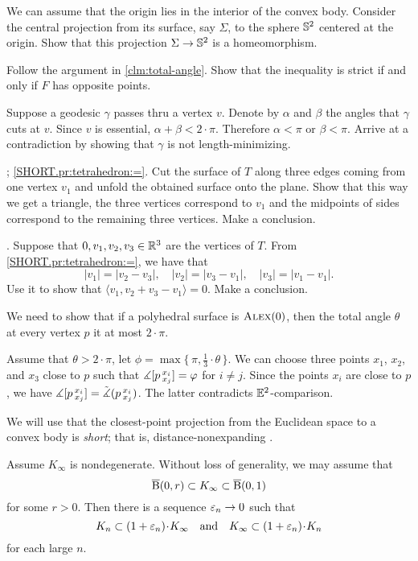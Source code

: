 We can assume that the origin lies in the interior of the convex body.
Consider the central projection from its surface, say $\Sigma$, to the sphere $\mathbb{S}^2$ centered at the origin.
Show that this projection $\Sigma\to \mathbb{S}^2$ is a homeomorphism.

Follow the argument in \ref{clm:total-angle}.
Show that the inequality is strict if and only if $F$ has opposite points.


Suppose a geodesic $\gamma$ passes thru a vertex $v$.
Denote by $\alpha$ and $\beta$ the angles that $\gamma$ cuts at $v$.
Since $v$ is essential, $\alpha+\beta<2\cdot\pi$.
Therefore $\alpha<\pi$ or $\beta<\pi$.
Arrive at a contradiction by showing that $\gamma$ is not length-minimizing.

\parbf{\ref{pr:tetrahedron}}; \ref{SHORT.pr:tetrahedron:=}.
Cut the surface of $T$ along three edges coming from one vertex $v_1$ and unfold the obtained surface onto the plane.
Show that this way we get a triangle, the three vertices correspond to $v_1$ and the midpoints of sides correspond to the remaining three vertices.
Make a conclusion.

\parit{\ref{SHORT.pr:tetrahedron:perp}}.
Suppose that $0,v_1,v_2,v_3\in\mathbb{R}^3$ are the vertices of $T$.
From \ref{SHORT.pr:tetrahedron:=}, we have that 
\[|v_1|=|v_2-v_3|,\quad |v_2|=|v_3-v_1|,\quad|v_3|=|v_1-v_1|.\]
Use it to show that $\langle v_1,v_2+v_3-v_1\rangle=0$.
Make a conclusion.

We need to show that if a polyhedral surface is $\textsc{Alex}(0)$, then the total angle $\theta$ at every vertex $p$ it at most $2\cdot\pi$.

Assume that $\theta>2\cdot\pi$,
let $\phi=\max\{\,\pi,\tfrac13\cdot\theta\,\}$.
We can choose three points $x_1$, $x_2$, and $x_3$ close to $p$ such that 
$\measuredangle [p\,{}^{x_i}_{x_j}]=\varphi$ for $i\ne j$.
Since the points $x_i$ are close to $p$, we have $\measuredangle [p\,{}^{x_i}_{x_j}]=\tilde\measuredangle(p\,{}^{x_i}_{x_j})$.
The latter contradicts $\mathbb{E}^2$-comparison. 

We will use that the closest-point projection from the Euclidean space to a convex body is \emph{short};
that is, distance-nonexpanding \cite[13.3]{petrunin-zamora}.

Assume $K_\infty$ is nondegenerate.
Without loss of generality, we may assume that 
\[\overline{\mathrm{B}}{}(0,r)\subset K_\infty\subset\overline{\mathrm{B}}{}(0,1)\]
for some $r>0$.
Then there is a sequence $\varepsilon_n\to 0$ such that 
\[ K_n\subset(1+\eps_n)\cdot K_\infty
\quad\text{and}\quad
K_\infty\subset(1+\eps_n)\cdot K_n\]
for each large $n$.

